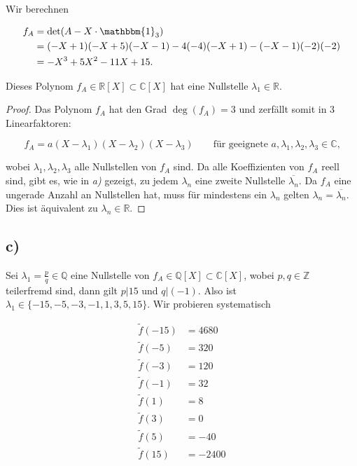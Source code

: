 \documentclass{article}
\newcommand{\ZZ}{\mathbb{Z}}
\newcommand{\QQ}{\mathbb{Q}}
\newcommand{\RR}{\mathbb{R}}
\newcommand{\CC}{\mathbb{C}}
\begin{document}
Wir berechnen

\[
\begin{aligned}
  f_A
  &=
  \det(A - X \cdot \mathbbm{1}_3 ) \\
  &=
  (-X+1)(-X+5)(-X-1)-4(-4)(-X+1)-(-X-1)(-2)(-2)\\
  &=
  -X^3+5X^2-11X+15.
\end{aligned}
\]

Dieses Polynom $f_A \in \RR[X] \subset \CC[X]$
hat eine Nullstelle $\lambda_1 \in \RR$.

\begin{proof}
  Das Polynom $f_A$ hat den Grad $\deg(f_A) = 3$
  und zerfällt somit in $3$ Linearfaktoren:

  \[
  f_A = a(X - \lambda_1)(X - \lambda_2)(X - \lambda_3) \qquad
  \text{für geeignete $a,\lambda_1,\lambda_2,\lambda_3 \in \CC$,}
  \]

  wobei $\lambda_1,\lambda_2,\lambda_3$
  alle Nullstellen von $f_A$ sind.
  Da alle Koeffizienten von $f_A$ reell sind, gibt es, wie in
  \textit{a)} gezeigt, zu jedem $\lambda_n$ eine
  zweite Nullstelle $\overline{\lambda_n}$.
  Da $f_A$ eine ungerade Anzahl an Nullstellen hat,
  muss für mindestens ein $\lambda_n$
  gelten $\lambda_n = \overline{\lambda_n}$.
  Dies ist äquivalent zu $\lambda_n \in \RR$.
\end{proof}

\newpage

\subsection*{c)}

Sei $\lambda_1 = \frac{p}{q} \in \QQ$ eine Nullstelle
von $f_A \in \QQ[X] \subset \CC[X]$, wobei $p,q \in \ZZ$
teilerfremd sind, 
dann gilt $p|15$ und $q|(-1)$.
Also ist $\lambda_1 \in \{ -15, -5, -3, -1, 1, 3, 5, 15 \}$.
Wir probieren systematisch

\[
\begin{aligned}
  \tilde{f}(-15) &= 4680\\
  \tilde{f}(-5) &= 320\\
  \tilde{f}(-3) &= 120\\
  \tilde{f}(-1) &= 32\\
  \tilde{f}(1) &= 8\\
  \tilde{f}(3) &= 0\\
  \tilde{f}(5) &= -40\\
  \tilde{f}(15) &= -2400\\
\end{aligned}
\]
\end{document}

